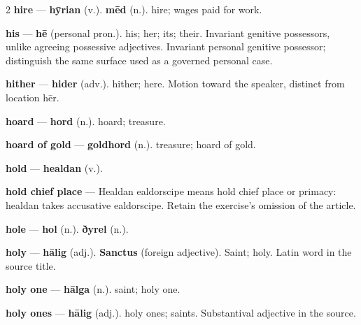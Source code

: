 \begin{multicols}{2}
\textbf{hire} — \textbf{hȳrian} (v.).  \textbf{mēd} (n.). hire; wages paid for work.\par
\textbf{his} — \textbf{hē} (personal pron.). his; her; its; their. Invariant genitive possessors, unlike agreeing possessive adjectives. Invariant personal genitive possessor; distinguish the same surface used as a governed personal case.\par
\textbf{hither} — \textbf{hider} (adv.). hither; here. Motion toward the speaker, distinct from location hēr.\par
\textbf{hoard} — \textbf{hord} (n.). hoard; treasure.\par
\textbf{hoard of gold} — \textbf{goldhord} (n.). treasure; hoard of gold.\par
\textbf{hold} — \textbf{healdan} (v.).\par
\textbf{hold chief place} — Healdan ealdorscipe means hold chief place or primacy: healdan takes accusative ealdorscipe. Retain the exercise’s omission of the article.\par
\textbf{hole} — \textbf{hol} (n.).  \textbf{ðyrel} (n.).\par
\textbf{holy} — \textbf{hālig} (adj.).  \textbf{Sanctus} (foreign adjective). Saint; holy. Latin word in the source title.\par
\textbf{holy one} — \textbf{hālga} (n.). saint; holy one.\par
\textbf{holy ones} — \textbf{hālig} (adj.). holy ones; saints. Substantival adjective in the source.\par

\end{multicols}
